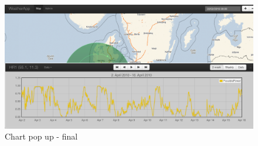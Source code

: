 \begin{figure}[htbp]
   \centering
   \includegraphics[width=1\linewidth]{figure/design_chart_final.eps}
   \caption{Chart pop up - final}
\end{figure}

